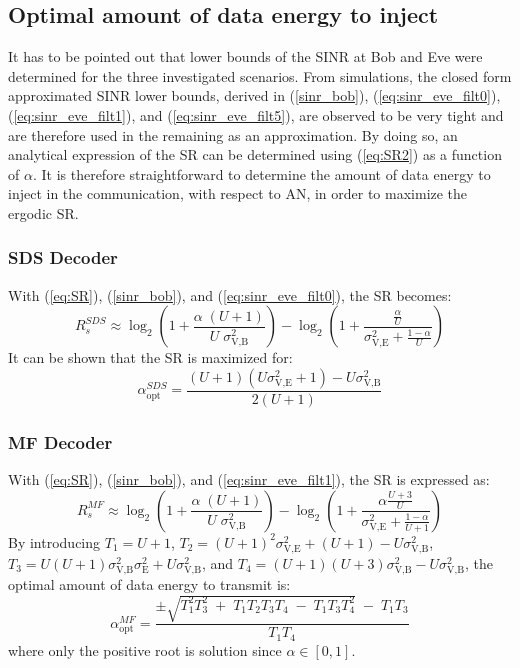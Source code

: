 \documentclass[journal,comsoc]{IEEEtran}
\begin{document}
\subsection{Optimal amount of data energy to inject}
\label{subsec:best_alpha}
It has to be pointed out that lower bounds of the SINR at Bob and Eve were determined for the three investigated scenarios. From simulations, the closed form approximated SINR lower bounds, derived in (\ref{sinr_bob}),  (\ref{eq:sinr_eve_filt0}), (\ref{eq:sinr_eve_filt1}), and (\ref{eq:sinr_eve_filt5}), are observed to be very tight and are therefore used in the remaining as an approximation. By doing so, an analytical expression of the SR can be determined using (\ref{eq:SR2}) as a function of $\alpha$. It is therefore straightforward to determine the amount of data energy to inject in the communication, with respect to AN, in order to maximize the ergodic SR.
\subsubsection{SDS Decoder}
 With (\ref{eq:SR}), (\ref{sinr_bob}), and (\ref{eq:sinr_eve_filt0}), the SR becomes:
\begin{equation}
R_s^{SDS} \approx \log_2 \left( 1 +  \frac{\alpha \;(U+1)}{U \; \sigma_{\text{V,B}}^2} \right) - \log_2\left( 1 + \frac{\frac{\alpha}{U}}{\sigma^2_{\text{V,E}}+\frac{1-\alpha}{U}}\right)
\label{eq:SR_anal2_decod_0}
\end{equation}
It can be shown that the SR is maximized for:
\begin{equation}
\alpha_{\text{opt}}^{SDS} = \frac{(U+1)(U\sigma_{\text{V,E}}^2 + 1)- U\sigma_{\text{V,B}}^2}{2(U+1)}
\label{eq:optimal_alpha_decod_0}
\end{equation}


\subsubsection{MF Decoder}
With (\ref{eq:SR}), (\ref{sinr_bob}), and (\ref{eq:sinr_eve_filt1}), the SR is expressed as:
\begin{equation}
R_s^{MF} \approx \log_2 \left( 1 +  \frac{\alpha \;(U+1)}{U \; \sigma_{\text{V,B}}^2} \right) - \log_2\left( 1 +  \frac{\alpha \frac{U+3}{U}}{\sigma^2_{\text{V,E}} + \frac{1-\alpha}{U+1}}\right)
\label{eq:SR_anal2_decod_1}
\end{equation}
By introducing $T_1 = U+1$, $T_2 = (U+1)^2\sigma_{\text{V,E}}^2 + (U+1) - U\sigma_{\text{V,B}}^2$, $T_3 = U(U+1)\sigma_{\text{V,B}}^2\sigma_{\text{E}}^2 + U \sigma_{\text{V,B}}^2$, and $T_4=(U+1)(U+3)\sigma_{\text{V,B}}^2-U\sigma_{\text{V,B}}^2$, the optimal amount of data energy to transmit is: 
\begin{equation}
\alpha_{\text{opt}}^{MF} = \frac{\pm\sqrt{T_1^2 T_3^2 \; + \; T_1 T_2 T_3 T_4 \; - \; T_1 T_3 T_4^2} \; - \; T_1 T_3}{T_1 T_4}
\label{eq:optimal_alpha_decod_1}
\end{equation}
where only the positive root is solution since $\alpha \in [0,1]$.
\end{document}
